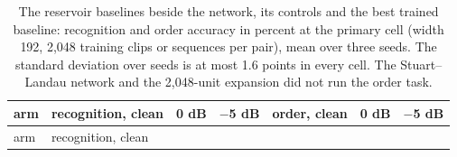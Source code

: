 \documentclass{article}
\begin{document}
\begin{longtable}[]{@{}
  >{\raggedright\arraybackslash}p{}
  >{\raggedright\arraybackslash}p{}
  >{\raggedright\arraybackslash}p{}
  >{\raggedright\arraybackslash}p{}
  >{\raggedright\arraybackslash}p{}
  >{\raggedright\arraybackslash}p{}
  >{\raggedright\arraybackslash}p{}@{}}
\caption{The reservoir baselines beside the network, its controls and
the best trained baseline: recognition and order accuracy in percent at
the primary cell (width 192, 2,048 training clips or sequences per
pair), mean over three seeds. The standard deviation over seeds is at
most 1.6 points in every cell. The Stuart--Landau network and the
2,048-unit expansion did not run the order task.}\tabularnewline
\toprule\noalign{}
\begin{minipage}[b]{\linewidth}\raggedright
arm
\end{minipage} & \begin{minipage}[b]{\linewidth}\raggedright
recognition, clean
\end{minipage} & \begin{minipage}[b]{\linewidth}\raggedright
0 dB
\end{minipage} & \begin{minipage}[b]{\linewidth}\raggedright
\ensuremath{-}5 dB
\end{minipage} & \begin{minipage}[b]{\linewidth}\raggedright
order, clean
\end{minipage} & \begin{minipage}[b]{\linewidth}\raggedright
0 dB
\end{minipage} & \begin{minipage}[b]{\linewidth}\raggedright
\ensuremath{-}5 dB
\end{minipage} \\
\midrule\noalign{}
\endfirsthead
\toprule\noalign{}
\begin{minipage}[b]{\linewidth}\raggedright
arm
\end{minipage} & \begin{minipage}[b]{\linewidth}\raggedright
recognition, clean
\end{minipage} & \begin{minipage}[b]{\linewidth}\raggedright

\end{minipage}
\end{longtable}
\end{document}
